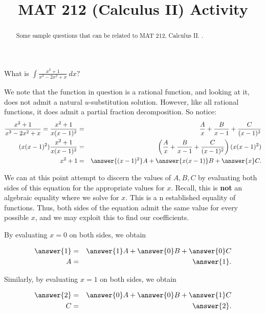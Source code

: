 \documentclass{ximera}
\title{MAT 212 (Calculus II) Activity}
\begin{document}
      
\begin{abstract}
      
Some sample questions that can be related to MAT 212, Calculus II.
.
      
\end{abstract}
      
\maketitle
      
      
\begin{question}      
What is $\displaystyle\int \frac{x^2+1}{x^3-2x^2+x}\ dx?$

\end{question}
\begin{explanation}
We note that the function in question is a rational function, and looking at it, does not admit a natural $u$-substitution solution.  However, like all rational functions, it does admit a partial fraction decomposition.  So notice:
\begin{eqnarray*}
\frac{x^2+1}{x^3-2x^2+x}=\frac{x^2+1}{x(x-1)^2}&=&\frac{A}{x}+\frac{B}{x-1}+\frac{C}{(x-1)^2}\\
(x(x-1)^2)\frac{x^2+1}{x(x-1)^2}&=&\left(\frac{A}{x}+\frac{B}{x-1}+\frac{C}{(x-1)^2}\right)(x(x-1)^2)\\
x^2+1&=&\answer{(x-1)^2}A+\answer{x(x-1)}B+\answer{x}C.
\end{eqnarray*}

We can at this point attempt to discern the values of $A, B, C$ by evaluating both sides of this equation for the appropriate values for $x$.  Recall, this is \textbf{not} an algebraic equality where we solve for $x$.  This is a n established equality of functions.  Thus, both sides of the equation admit the same value for every possible $x$, and we may exploit this to find our coefficients.

By evaluating $x=0$ on both sides, we obtain

\begin{eqnarray*}
\answer{1}&=&\answer{1}A+\answer{0}B+\answer{0}C\\
A&=&\answer{1}.
\end{eqnarray*}

Similarly, by evaluating $x=1$ on both sides, we obtain

\begin{eqnarray*}
\answer{2}&=&\answer{0}A+\answer{0}B+\answer{1}C\\
C&=&\answer{2}.
\end{eqnarray*}


\end{explanation}
\end{document}
